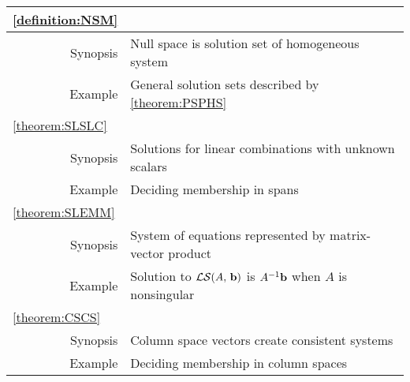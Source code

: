 \documentclass{ximera}
\begin{document}
\begin{tabular}{|r|l|}\hline\hline
  \multicolumn{1}{|l}{\ref{definition:NSM}}&\\\hline
  Synopsis&Null space is solution set of homogeneous system\\\hline
  Example&General solution sets described by \ref{theorem:PSPHS}\\\hline\hline
  \multicolumn{1}{|l}{\ref{theorem:SLSLC}}&\\\hline
  Synopsis&Solutions for linear combinations with unknown scalars\\\hline
  Example&Deciding membership in spans\\\hline\hline
  \multicolumn{1}{|l}{\ref{theorem:SLEMM}}&\\\hline
  Synopsis&System of equations represented by matrix-vector product\\\hline
  Example&Solution to $\mathcal{LS}\!\left(A,\,\mathbf{b}\right)$ is $A^{-1}\mathbf{b}$ when $A$ is nonsingular\\\hline\hline
  \multicolumn{1}{|l}{\ref{theorem:CSCS}}&\\\hline
  Synopsis&Column space vectors create consistent systems\\\hline
  Example&Deciding membership in column spaces\\\hline\hline
\end{tabular}
\end{document}
